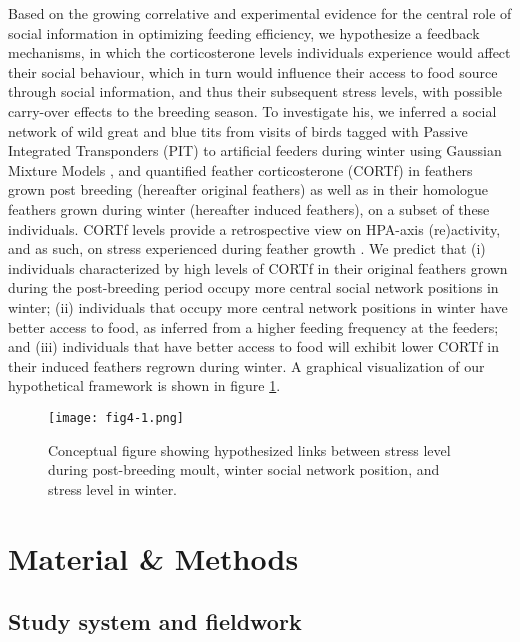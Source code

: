 \documentclass[10pt, twoside]{book} %
\begin{document}
Based on the growing correlative and experimental evidence for the central role of social information in optimizing feeding efficiency, we hypothesize a feedback mechanisms, in which the corticosterone levels individuals experience would affect their social behaviour, which in turn would influence their access to food source through social information, and thus their subsequent stress levels, with possible carry-over effects to the breeding season. To investigate his, we inferred a social network of wild great and blue tits from visits of birds tagged with Passive Integrated Transponders (PIT) to artificial feeders during winter using Gaussian Mixture Models \citep{Psorakis2012}, and quantified feather corticosterone (CORTf) in feathers grown post breeding (hereafter original feathers) as well as in their homologue feathers grown during winter (hereafter induced feathers), on a subset of these individuals. CORTf levels provide a retrospective view on HPA-axis (re)activity, and as such, on stress experienced during feather growth \citep{Romero2016}. We predict that (i) individuals characterized by high levels of CORTf in their original feathers grown during the post-breeding period occupy more central social network positions in winter; (ii) individuals that occupy more central network positions in winter have better access to food, as inferred from a higher feeding frequency at the feeders; and (iii) individuals that have better access to food will exhibit lower CORTf in their induced feathers regrown during winter. A graphical visualization of our hypothetical framework is shown in figure \ref{fig4-1}.\\

\begin{figure}[h!]
	\begin{center}
		\texttt{[image: fig4-1.png]}
	\end{center}
	\caption{Conceptual figure showing hypothesized links between stress level during post-breeding moult, winter social network position, and stress level in winter.}\label{fig4-1}
\end{figure}

\clearpage
	\section{Material \& Methods}\label{mm4}
	
		\subsection*{Study system and fieldwork}
	
\end{document}
